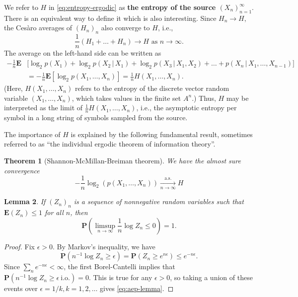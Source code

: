 \documentclass[12pt]{article}
\newtheorem{thm}{Theorem}[section]
\newtheorem{lem}[thm]{Lemma}
\newcommand{\prob}{\mathbf{P}}
\newcommand{\expec}{\mathbf{E}}
\theoremstyle{example}
\begin{document}
We refer to $H$ in \eqref{eq:entropy-ergodic} as \textbf{the entropy of the source $(X_n)_{n=1}^\infty$}. There is an equivalent way to define it which is also interesting. Since $H_n\to H$, the Ces\`aro averages of $(H_n)_n$ also converge to $H$, i.e.,
$$ \frac{1}{n}(H_1+\ldots+H_n) \to H \textrm{ as }n\to\infty. $$
The average on the left-hand side can be written as
\begin{align*}
-\frac1n \expec&\Big[ \log_2 p(X_1) + \log_2 p(X_2\,|\,X_1)
+ \log_2 p(X_3\,|\,X_1,X_2) + \ldots + p(X_n\,|\,X_1,\ldots,X_{n-1}) \Big]
\\ &= -\frac1n \expec \left[\log_2 p(X_1,\ldots,X_n)\right] = \frac{1}{n}H(X_1,\ldots,X_n).
\end{align*}
(Here, $H(X_1,\ldots,X_n)$ refers to the entropy of the discrete vector random variable $(X_1,\ldots,X_n)$, which takes values in the finite set $A^n$.) Thus, $H$ may be interpreted as the limit of $\frac{1}{n} H(X_1,\ldots,X_n)$, i.e., the asymptotic entropy per symbol in a long string of symbols sampled from the source.

The importance of $H$ is explained by the following fundamental result, sometimes referred to as ``the individual ergodic theorem of information theory''.

\begin{thm}[Shannon-McMillan-Breiman theorem]
\label{thm-shannon-mcmillan-breiman}
We have the almost sure convergence
\begin{equation} \label{eq:shannon-mcmillan-breiman}
-\frac{1}{n}\log_2(p(X_1,\ldots,X_n)) \xrightarrow[n\to\infty]{\textrm{a.s.}} H
\end{equation}
\end{thm}

\begin{lem} 
\label{lem-aep-lemma}
If $(Z_n)_n$ is a sequence of nonnegative random variables such that $\expec(Z_n)\le 1$ for all $n$, then
\begin{equation} \label{eq:aep-lemma}
\prob\left(\limsup_{n\to\infty} \frac{1}{n} \log Z_n \le 0\right) = 1.
\end{equation}
\end{lem}

\begin{proof}
Fix $\epsilon>0$. By Markov's inequality, we have
$$ \prob(n^{-1} \log Z_n \ge \epsilon) = \prob(Z_n \ge e^{n\epsilon}) \le e^{-n\epsilon}. $$
Since $\sum_n e^{-n\epsilon}<\infty$, the first Borel-Cantelli implies that 
$\prob(n^{-1} \log Z_n \ge \epsilon \ \textrm{i.o.}) = 0$. This is true for any $\epsilon>0$, so taking a union of these events over $\epsilon=1/k, k=1,2,\ldots$ gives \eqref{eq:aep-lemma}.
\end{proof}
\end{document}
